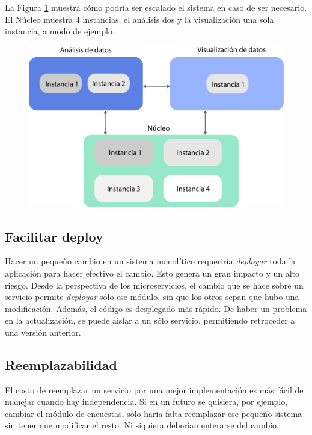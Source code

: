 La Figura \ref{fig:microescala} muestra cómo podría ser escalado el sistema en caso de ser necesario. El Núcleo muestra 4 instancias, el análisis dos y la visualización una sola instancia, a modo de ejemplo.

\begin{figure}[h!]
  \centering
    \includegraphics[scale=0.7]{images/escalamiento.png}
  \label{fig:microescala}
\end{figure}

\subsection[Facilitar deploy]{Facilitar deploy}

Hacer un pequeño cambio en un sistema monolítico requeriría \textit{deployar} toda la aplicación para hacer efectivo el cambio. Esto genera un gran impacto y un alto riesgo. 
Desde la perspectiva de los microservicios, el cambio que se hace sobre un servicio permite \textit{deployar} sólo ese módulo, sin que los otros sepan que hubo una modificación. Además, el código es desplegado más rápido. 
De haber un problema en la actualización, se puede aislar a un sólo servicio, permitiendo retroceder a una versión anterior.

\subsection[Reemplazabilidad]{Reemplazabilidad}

El costo de reemplazar un servicio por una mejor implementación es más fácil de manejar cuando hay independencia. 
Si en un futuro se quisiera, por ejemplo, cambiar el módulo de encuestas, sólo haría falta reemplazar ese pequeño sistema sin tener que modificar el resto. Ni siquiera deberían enterarse del cambio.

